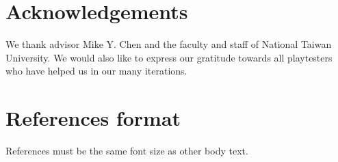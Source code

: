 \documentclass{chi-ext}
\begin{document}


\section{Acknowledgements}
We thank advisor Mike Y. Chen and the faculty and staff of National Taiwan University.
We would also like to express our gratitude towards all playtesters who have helped us in our many iterations. 


\section{References format}
References must be the same font size as other body text.

\balance


\end{document}
